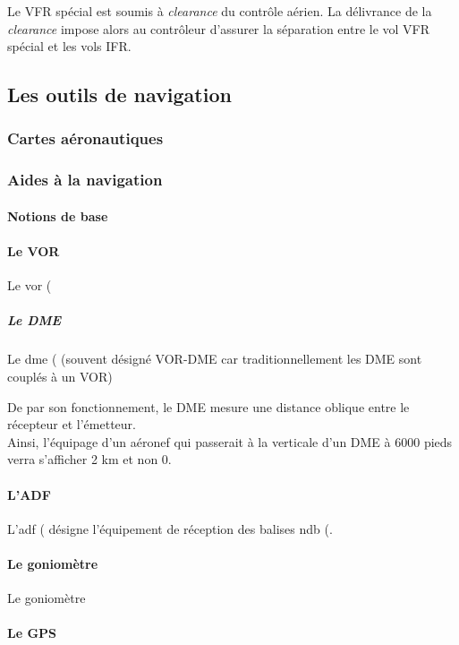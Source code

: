 		
		Le VFR spécial est soumis à \textit{clearance} du contrôle aérien. La délivrance de la \textit{clearance} impose alors au contrôleur d'assurer la séparation entre le vol VFR spécial et les vols IFR.
		
	
	\subsection{Les outils de navigation}
		\subsubsection{Cartes aéronautiques}
		
		\subsubsection{Aides à la navigation}
			\paragraph{Notions de base}
			
			\paragraph{Le VOR}
			Le \acrshort{vor} (
			
			\subparagraph{Le DME}
			Le \acrshort{dme} ( (souvent désigné VOR-DME car traditionnellement les DME sont couplés à un VOR)
			
			\alert{De par son fonctionnement, le DME mesure une distance oblique entre le récepteur et l'émetteur. \\ Ainsi, l'équipage d'un aéronef qui passerait à la verticale d'un DME à 6000 pieds verra s'afficher 2 km et non 0.}
			
			\paragraph{L'ADF}
			L'\acrshort{adf} ( désigne l'équipement de réception des balises \acrshort{ndb} (.
			
			\paragraph{Le goniomètre}
			Le \gls{goniomètre}
			
			\paragraph{Le GPS}
